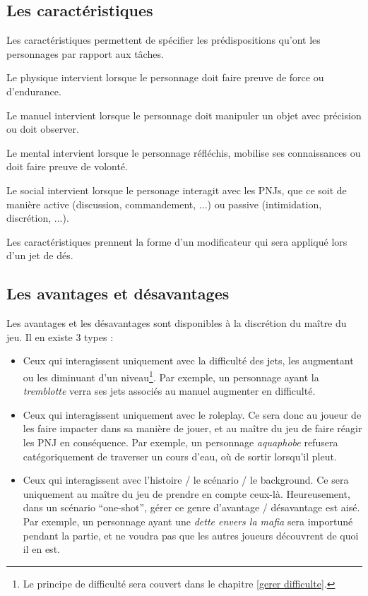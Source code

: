 \documentclass[oneside,12pt]{article}
\begin{document}
\subsection{Les caract\'eristiques}
Les caract\'eristiques permettent de sp\'ecifier les pr\'edispositions qu'ont les personnages par rapport aux t\^aches.

Le physique intervient lorsque le personnage doit faire preuve de force ou d'endurance.

Le manuel intervient lorsque le personnage doit manipuler un objet avec pr\'ecision ou doit observer.

Le mental intervient lorsque le personnage r\'efl\'echis, mobilise ses connaissances ou doit faire preuve de volont\'e.

Le social intervient lorsque le personage interagit avec les PNJs, que ce soit de mani\`ere active (discussion, commandement, ...) ou passive (intimidation, discr\'etion, ...).

Les caract\'eristiques prennent la forme d'un modificateur qui sera appliqu\'e lors d'un jet de d\'es.
\subsection{Les avantages et d\'esavantages}
Les avantages et les d\'esavantages sont disponibles \`a la discr\'etion du ma\^itre du jeu.
Il en existe 3 types :
\begin{itemize}
\item
  Ceux qui interagissent uniquement avec la difficult\'e des jets, les augmentant ou les diminuant d'un niveau\footnote{Le principe de difficult\'e sera couvert dans le chapitre \ref{gerer difficulte}.}.
  Par exemple, un personnage ayant la \textit{tremblotte} verra ses jets associ\'es au manuel augmenter en difficult\'e.
\item
  Ceux qui interagissent uniquement avec le roleplay.
  Ce sera donc au joueur de les faire impacter dans sa mani\`ere de jouer, et au ma\^itre du jeu de faire r\'eagir les PNJ en cons\'equence.
  Par exemple, un personnage \textit{aquaphobe} refusera cat\'egoriquement de traverser un cours d'eau, o\`u de sortir lorsqu'il pleut.
\item
  Ceux qui interagissent avec l'histoire / le sc\'enario / le background.
  Ce sera uniquement au ma\^itre du jeu de prendre en compte ceux-l\`a.
  Heureusement, dans un sc\'enario ``one-shot'', g\'erer ce genre d'avantage / d\'esavantage est ais\'e.
  Par exemple, un personnage ayant une \textit{dette envers la mafia} sera importun\'e pendant la partie, et ne voudra pas que les autres joueurs d\'ecouvrent de quoi il en est.
\end{itemize}
\end{document}
